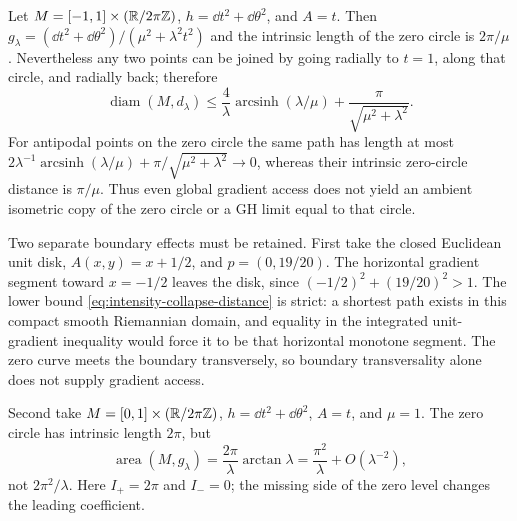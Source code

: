 \begin{example}
\label{ex:intensity-cylinder-shortcut}
Let $M=[-1,1]\times(\mathbb{R}/2\pi\mathbb{Z})$, $h=\dd t^2+\dd\theta^2$, and $A=t$.
Then $g_\lambda=(\dd t^2+\dd\theta^2)/(\mu^2+\lambda^2t^2)$ and the
intrinsic length of the zero circle is $2\pi/\mu$.  Nevertheless any two points
can be joined by going radially to $t=1$, along that circle, and radially back;
therefore
\[
 \operatorname{diam}(M,d_\lambda)
 \le\frac{4}{\lambda}\operatorname{arcsinh}(\lambda/\mu)
       +\frac{\pi}{\sqrt{\mu^2+\lambda^2}}.
\]
For antipodal points on the zero circle the same path has length at most
$2\lambda^{-1}\operatorname{arcsinh}(\lambda/\mu)
+\pi/\sqrt{\mu^2+\lambda^2}\to0$, whereas their intrinsic zero-circle
distance is $\pi/\mu$.  Thus even global gradient access does not yield an
ambient isometric copy of the zero circle or a GH limit equal to that circle.
\end{example}

\begin{example}
\label{ex:intensity-boundary-controls}
Two separate boundary effects must be retained.
First take the closed Euclidean unit disk, $A(x,y)=x+1/2$, and
$p=(0,19/20)$.  The horizontal gradient segment toward $x=-1/2$ leaves the disk,
since $(-1/2)^2+(19/20)^2>1$.  The lower bound
\eqref{eq:intensity-collapse-distance} is strict: a shortest path exists in
this compact smooth Riemannian domain, and equality in the integrated
unit-gradient inequality would force it to be that horizontal monotone segment.
The zero curve meets the boundary transversely, so boundary transversality alone
does not supply gradient access.

Second take $M=[0,1]\times(\mathbb{R}/2\pi\mathbb{Z})$, $h=\dd t^2+\dd\theta^2$,
$A=t$, and $\mu=1$.  The zero circle has intrinsic length $2\pi$, but
\[
 \operatorname{area}(M,g_\lambda)
 =\frac{2\pi}{\lambda}\arctan\lambda
 =\frac{\pi^2}{\lambda}+O(\lambda^{-2}),
\]
not $2\pi^2/\lambda$.  Here $I_+=2\pi$ and $I_-=0$; the missing side of
the zero level changes the leading coefficient.
\end{example}

